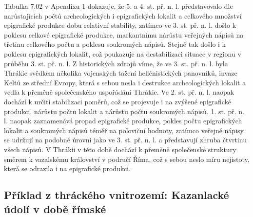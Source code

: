 Tabulka 7.02 v Apendixu 1 dokazuje, že 5. a 4. st. př. n. l. představovalo dle narůstajících počtů archeologických i epigrafických lokalit a celkového množství epigrafické produkce dobu relativní stability, zatímco ve 3. st. př. n. l. došlo k poklesu celkové epigrafické produkce, markantnímu nárůstu veřejných nápisů na třetinu celkového počtu a poklesu soukromých nápisů. Stejně tak došlo i k poklesu epigrafických lokalit, což poukazuje na destabilizaci situace v regionu v průběhu 3. st. př. n. l. Z historických zdrojů víme, že ve 3. st. př. n. l. byla Thrákie svědkem několika vojenských tažení hellénistických panovníků, invaze Keltů ze střední Evropy, která s sebou nesla i destrukce archeologických lokalit a vedla k přeměně společenského uspořádání Thrákie. Ve 2. st. př. n. l. naopak dochází k určití stabilizaci poměrů, což se projevuje i na zvýšené epigrafické produkci, nárůstu počtu lokalit a nárůstu počtu soukromých nápisů. 1. st. př. n. l. naopak zaznamenává propad epigrafické produkce, pokles počtu epigrafických lokalit a soukromých nápisů téměř na poloviční hodnoty, zatímco veřejné nápisy se udržují na podobné úrovni jako ve 3. st. př. n. l. a představují zhruba čtvrtinu všech nápisů. V Thrákii v této době dochází k přeměně společenské struktury směrem k vazalskému království v područí Říma, což s sebou neslo míru nejistoty, která se odrazila i na epigrafické produkci.

\subsection[příklad-z-thráckého-vnitrozemí-kazanlacké-údolí-v-době-římské]{Příklad z thráckého vnitrozemí: Kazanlacké údolí v době římské}

